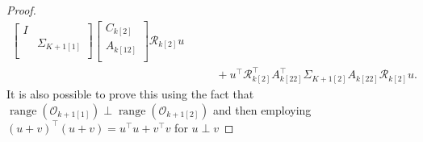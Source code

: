 \documentclass[doctype=mastersthesis,BCOR=15mm,biblatex]{ldvbook}%
\DeclareMathOperator{\range}{range}
\newcommand{\R}{\mathcal{R}} %
\newcommand{\Ob}{\mathcal{O}} %
\newcommand{\eye}{I} %
\begin{document}
\begin{proof}
\begin{align}
	\begin{bmatrix}
	\eye & \\
	& \Sigma_{K+1[1]}\\
	\end{bmatrix} 
	\begin{bmatrix}
	C_{k[2]}\\
	A_{k[12]}\\
	\end{bmatrix}  
	\R_{k[2]} u
\\&\quad\quad+
	u^\top
	\R_{k[2]}^\top
	A_{k[22]}^\top 
	\Sigma_{K+1[2]}
	A_{k[22]} 
	\R_{k[2]} u
	.
\end{align}
	It is also possible to prove this using the fact that $\range(\Ob_{k+1[1]})\perp \range(\Ob_{k+1[2]})$ and then employing $(u+v)^\top (u+v) = u^\top u + v^\top v$ for $u \perp v$
\end{proof}
\end{document}

